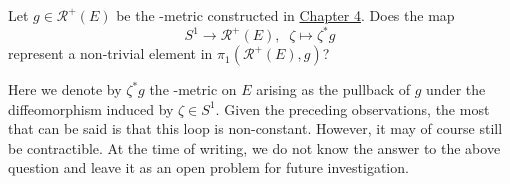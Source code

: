 \begin{question*}
	Let $g \in \mathcal{R}^+(E)$ be the \psc-metric constructed in \hyperref[chapter:main_construction]{Chapter 4}. Does the map 
	\[
	S^1 \to \mathcal{R}^+(E), \;\; \zeta \mapsto \zeta^\ast g
	\] 
	represent a non-trivial element in $\pi_1(\mathcal{R}^+(E),g)$?
\end{question*}

Here we denote by $\zeta^\ast g$ the \psc-metric on $E$ arising as the pullback of $g$ under the diffeomorphism induced by $\zeta \in S^1$. Given the preceding observations, the most that can be said is that this loop is non-constant. However, it may of course still be contractible. At the time of writing, we do not know the answer to the above question and leave it as an open problem for future investigation.